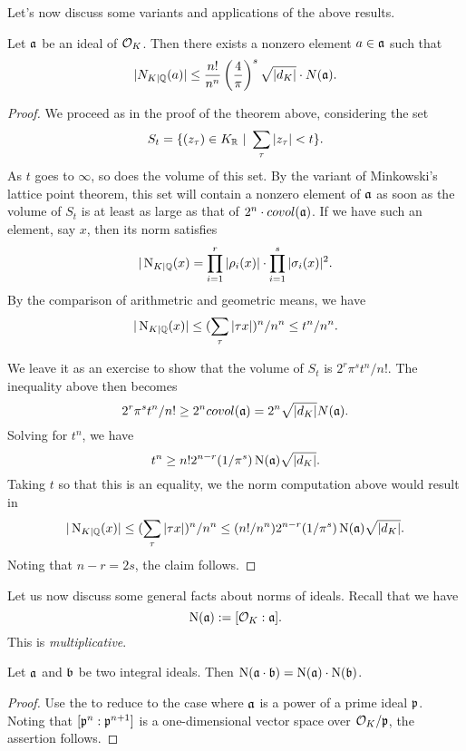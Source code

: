 Let's now discuss some variants and applications of the above results.
\begin{theorem}
  Let $\mathfrak{a}$ be an ideal of $\mathcal{O}_{K}$.
  Then there exists a nonzero element $a \in \mathfrak{a}$ such that
  \[ |N_{K|\mathbb{Q}}(a)| \leq \frac{n!}{n^{n}}\left(\frac{4}{\pi}\right)^{s} \sqrt{|d_{K}|} \cdot N(\mathfrak{a}). \]
\end{theorem}
\begin{proof}
  We proceed as in the proof of the theorem above, considering the set
  \[ S_{t} = \{ (z_{\tau}) \in K_{\mathbb{R}} \ | \  \sum_{\tau} | z_{\tau}| < t \}. \]
  As $t$ goes to $\infty$, so does the volume of this set.
  By the variant of Minkowski's lattice point theorem, this set will contain a nonzero element of $\mathfrak{a}$ as soon as the volume of $S_{t}$ is at least as large as that of $2^{n} \cdot covol(\mathfrak{a})$.
  If we have such an element, say $x$, then its norm satisfies
  \[ |\operatorname{N}_{K|\mathbb{Q}}(x) = \prod_{i = 1}^{r}|\rho_{i}(x)| \cdot \prod_{i = 1}^{s}|\sigma_{i}(x)|^{2}. \]
  By the comparison of arithmetric and geometric means, we have
  \[ |\operatorname{N}_{K|\mathbb{Q}}(x)| \leq (\sum_{\tau}|\tau x|)^{n}/n^{n} \leq t^{n}/n^{n}. \]

  We leave it as an exercise to show that the volume of $S_{t}$ is $2^{r}\pi^{s}t^{n}/n!$.
  The inequality above then becomes
  \[ 2^{r}\pi^{s}t^{n}/n! \geq 2^{n} covol(\mathfrak{a}) = 2^{n} \sqrt{|d_{K}|} N(\mathfrak{a}). \]
  Solving for $t^{n}$, we have
  \[ t^{n} \geq n! 2^{n-r} (1/\pi^{s}) \operatorname{N}(\mathfrak{a}) \sqrt{|d_{K}|}. \]
  Taking $t$ so that this is an equality, we the norm computation above would result in
  \[ |\operatorname{N}_{K|\mathbb{Q}}(x)| \leq (\sum_{\tau}|\tau x|)^{n}/n^{n} \leq (n!/n^{n}) 2^{n-r} (1/\pi^{s}) \operatorname{N}(\mathfrak{a}) \sqrt{|d_{K}|}. \]
  Noting that $n - r = 2s$, the claim follows.
\end{proof}

Let us now discuss some general facts about norms of ideals.
Recall that we have
\[ \operatorname{N}(\mathfrak{a}) := [\mathcal{O}_{K}:\mathfrak{a}]. \]
This is \emph{multiplicative}.
\begin{lemma}
  Let $\mathfrak{a}$ and $\mathfrak{b}$ be two integral ideals.
  Then $\operatorname{N}(\mathfrak{a}\cdot\mathfrak{b}) = \operatorname{N}(\mathfrak{a}) \cdot \operatorname{N}(\mathfrak{b})$.
\end{lemma}
\begin{proof}
  Use the  to reduce to the case where $\mathfrak{a}$ is a power of a prime ideal $\mathfrak{p}$.
  Noting that $[\mathfrak{p}^{n}:\mathfrak{p}^{n+1}]$ is a one-dimensional vector space over $\mathcal{O}_{K}/\mathfrak{p}$, the assertion follows.
\end{proof}

